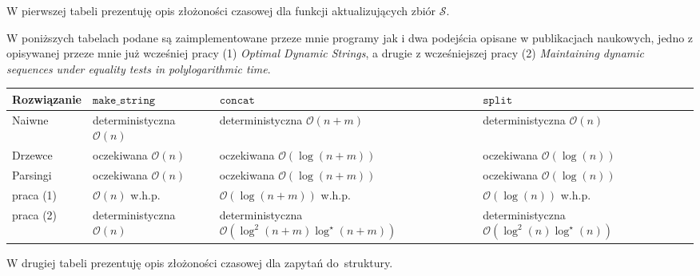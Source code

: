 \documentclass[declaration,shortabstract]{iithesis}
\theoremstyle{definition} \newtheorem{definition}{Definicja}[chapter]
\theoremstyle{remark} \newtheorem{remark}[definition]{Obserwacja}
\theoremstyle{plain} \newtheorem{theorem}[definition]{Twierdzenie}
\theoremstyle{remark} \newtheorem{example}{Przykład}[definition]
\theoremstyle{plain} \newtheorem{lemma}[definition]{Lemat}
\begin{document}
W pierwszej tabeli prezentuję opis złożoności czasowej dla funkcji aktualizujących zbiór $\mathcal{S}$. 

W poniższych tabelach podane są zaimplementowane przeze mnie programy jak i dwa podejścia opisane w publikacjach naukowych, jedno z opisywanej przeze mnie już wcześniej pracy (1) \textit{Optimal Dynamic Strings}, a drugie z wcześniejszej pracy (2) \textit{Maintaining dynamic sequences under equality tests in polylogarithmic time}.

\begin{center}
    \begin{tabular}{ | m{3cm} | >{\centering\arraybackslash}m{3cm} | >{\centering\arraybackslash}m{3cm} | >{\centering\arraybackslash}m{3cm} | }
        \hline 
        Rozwiązanie & $\texttt{make\_string}$ & $\texttt{concat}$ & $\texttt{split}$ \\
        \hline
        Naiwne & deterministyczna $\mathcal{O}(n)$ & deterministyczna $\mathcal{O}(n + m)$ & deterministyczna $\mathcal{O}(n)$ \\
        \hline
        Drzewce & oczekiwana $\mathcal{O}(n)$ & oczekiwana $\mathcal{O}(\log(n + m))$ & oczekiwana $\mathcal{O}(\log(n))$ \\
        \hline
        Parsingi & oczekiwana $\mathcal{O}(n)$ & oczekiwana $\mathcal{O}(\log(n + m))$ & oczekiwana $\mathcal{O}(\log(n))$ \\
        \hline
        praca (1) & $\mathcal{O}(n)$ w.h.p. & $\mathcal{O}(\log(n + m))$ w.h.p. & $\mathcal{O}(\log(n))$ w.h.p. \\
        \hline
        praca (2) & deterministyczna $\mathcal{O}(n)$ & deterministyczna $\mathcal{O}(\log^2(n + m)\log^\star(n + m))$ & deterministyczna $\mathcal{O}(\log^2(n)\log^\star(n))$ \\
        \hline
    \end{tabular}
\end{center}

W drugiej tabeli prezentuję opis złożoności czasowej dla zapytań do~struktury.
\end{document}
